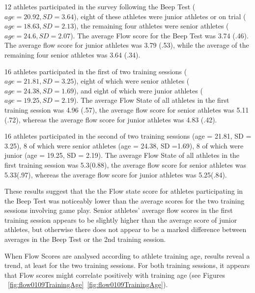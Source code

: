 \begin{CJK}{UTF8}{gbsn}
12 athletes participated in the survey following the Beep Test ($age = 20.92, SD = 3.64$), eight of these athletes were junior athletes or on trial ($age = 18.63, SD = 2.13$), the remaining four athletes were senior athletes ($age = 24.6, SD = 2.07$).  The average Flow score for the Beep Test was 3.74 (.46).  The average flow score for junior athletes was 3.79 (.53), while the average of the remaining four senior athletes was 3.64 (.34).

16 athletes participated in the first of two training sessions ($age = 21.81, SD = 3.25$), eight of which were senior athletes ($age = 24.38, SD =1.69$), and eight of which were junior athletes ($age = 19.25, SD = 2.19$). The average Flow State of all athletes in the first training session was 4.96 (.57), the average flow score for senior athletes was 5.11 (.72), whereas the average flow score for junior athletes was 4.83 (.42).

16 athletes participated in the second of two training sessions (age = 21.81, SD = 3.25), 8 of which were senior athletes (age = 24.38, SD =1.69), 8 of which were junior (age = 19.25, SD = 2.19). The average Flow State of all athletes in the first training session was 5.3(0.88), the average flow score for senior athletes was 5.33(.97), whereas the average flow score for junior athletes was 5.25(.84).

These results suggest that the the Flow state score for athletes participating in the Beep Test was noticeably lower than the average scores for the two training sessions involving game play. Senior athletes' average flow scores in the first training session appears to be slightly higher than the average score of junior athletes, but otherwise there does not appear to be a marked difference between averages in the Beep Test or the 2nd training session.

When Flow Scores are analysed according to athlete training age, results reveal a trend, at least for the two training sessions. For both training sessions, it appears that Flow scores might correlate positively with training age (see Figures ~\ref{fig:flow0109TrainingAge}\nobreakdash~\ref{fig:flow0109TrainingAge}).


\end{CJK}
